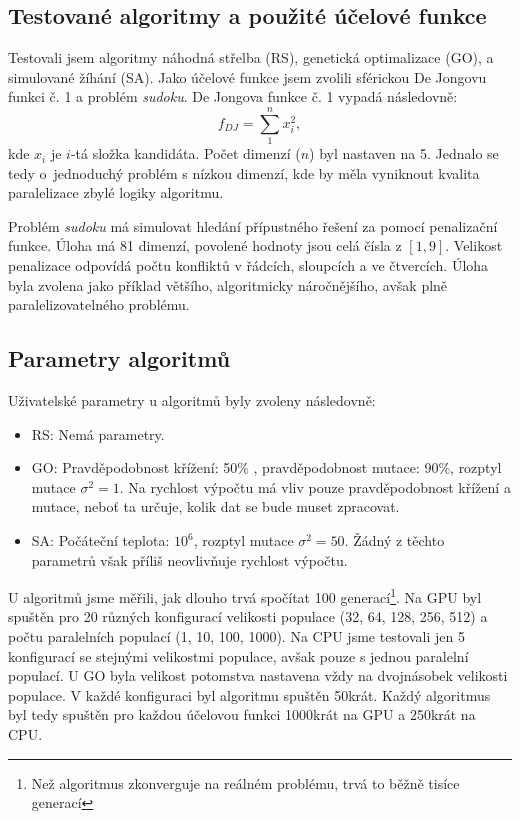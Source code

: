 \subsection{Testované algoritmy a použité účelové funkce}
Testovali jsem algoritmy náhodná střelba (RS), genetická optimalizace (GO), a simulované žíhání (SA). Jako účelové funkce jsem zvolili sférickou De Jongovu funkci č. 1 a problém \emph{sudoku}. De Jongova funkce č. 1 vypadá následovně:
\[
f_{DJ} = \sum_1^n x_i^2,
\]
kde $x_i$ je $i$-tá složka kandidáta. Počet dimenzí ($n$) byl nastaven na 5. Jednalo se tedy o~jednoduchý problém s nízkou dimenzí, kde by měla vyniknout kvalita paralelizace zbylé logiky algoritmu.

Problém \emph{sudoku} má simulovat hledání přípustného řešení za pomocí penalizační funkce. Úloha má 81 dimenzí, povolené hodnoty jsou celá čísla z $[1,9]$. Velikost penalizace odpovídá počtu konfliktů v řádcích, sloupcích a ve čtvercích. Úloha byla zvolena jako příklad většího, algoritmicky náročnějšího, avšak plně paralelizovatelného problému.

\subsection{Parametry algoritmů}

Uživatelské parametry u algoritmů byly zvoleny následovně:
\begin{itemize}
  \item RS: Nemá parametry.
  \item GO: Pravděpodobnost křížení: 50\% , pravděpodobnost mutace: 90\%, rozptyl mutace $\sigma^2 = 1$. Na rychlost výpočtu má vliv pouze pravděpodobnost křížení a mutace, neboť ta určuje, kolik dat se bude muset zpracovat.
  \item SA: Počáteční teplota: $10^6$, rozptyl mutace $\sigma^2 = 50$. Žádný z těchto parametrů však příliš neovlivňuje rychlost výpočtu.
\end{itemize}

U algoritmů jsme měřili, jak dlouho trvá spočítat 100 generací\footnote{Než algoritmus zkonverguje na reálném problému, trvá to běžně tisíce generací}. Na GPU byl spuštěn pro 20 různých konfigurací velikosti populace (32, 64, 128, 256, 512) a počtu paralelních populací (1, 10, 100, 1000). Na CPU jsme testovali jen 5 konfigurací se stejnými velikostmi populace, avšak pouze s jednou \bq paralelní\eq~ populací. U GO byla velikost potomstva nastavena vždy na dvojnásobek velikosti populace. V každé konfiguraci byl algoritmu spuštěn 50krát. Každý algoritmus byl tedy spuštěn pro každou účelovou funkci 1000krát na GPU a 250krát na CPU.

